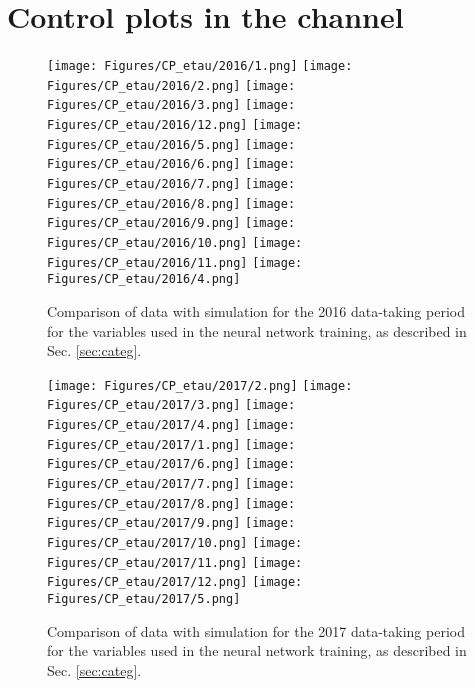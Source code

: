 \newpage
\section{Control plots in the \et channel}\label{app:control-plots}
\begin{figure}[H]
    \centering
    \texttt{[image: Figures/CP\_etau/2016/1.png]}
    \texttt{[image: Figures/CP\_etau/2016/2.png]}
    \texttt{[image: Figures/CP\_etau/2016/3.png]}
    \texttt{[image: Figures/CP\_etau/2016/12.png]}
    \texttt{[image: Figures/CP\_etau/2016/5.png]}
    \texttt{[image: Figures/CP\_etau/2016/6.png]}
    \texttt{[image: Figures/CP\_etau/2016/7.png]}
    \texttt{[image: Figures/CP\_etau/2016/8.png]}
    \texttt{[image: Figures/CP\_etau/2016/9.png]}
    \texttt{[image: Figures/CP\_etau/2016/10.png]}
    \texttt{[image: Figures/CP\_etau/2016/11.png]}
    \texttt{[image: Figures/CP\_etau/2016/4.png]}
    \caption{Comparison of data with simulation for the 2016 data-taking period for the variables used in the neural network training, as described in Sec. \ref{sec:categ}.}
\end{figure}

\begin{figure}[H]
    \centering
    \texttt{[image: Figures/CP\_etau/2017/2.png]}
    \texttt{[image: Figures/CP\_etau/2017/3.png]}
    \texttt{[image: Figures/CP\_etau/2017/4.png]}
    \texttt{[image: Figures/CP\_etau/2017/1.png]}
    \texttt{[image: Figures/CP\_etau/2017/6.png]}
    \texttt{[image: Figures/CP\_etau/2017/7.png]}
    \texttt{[image: Figures/CP\_etau/2017/8.png]}
    \texttt{[image: Figures/CP\_etau/2017/9.png]}
    \texttt{[image: Figures/CP\_etau/2017/10.png]}
    \texttt{[image: Figures/CP\_etau/2017/11.png]}
    \texttt{[image: Figures/CP\_etau/2017/12.png]}
    \texttt{[image: Figures/CP\_etau/2017/5.png]}
    \caption{Comparison of data with simulation for the 2017 data-taking period for the variables used in the neural network training, as described in Sec. \ref{sec:categ}.}
\end{figure}

